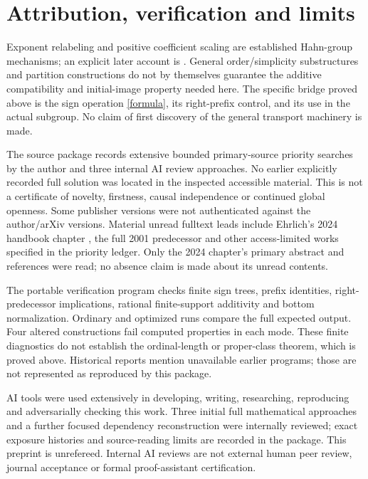 \documentclass[11pt]{article}
\begin{document}
\section{Attribution, verification and limits}
Exponent relabeling and positive coefficient scaling are established
Hahn-group mechanisms; an explicit later account is
\cite[Proposition 3.9 and Construction 3.10]{kks}.
General order/simplicity substructures and partition constructions
\cite{bvh} do not by themselves guarantee the additive compatibility and
initial-image property needed here. The specific bridge proved above is
the sign operation \eqref{formula}, its right-prefix control, and its use
in the actual subgroup. No claim of first discovery of the general
transport machinery is made.

The source package records extensive bounded primary-source priority
searches by the author and three internal AI review approaches.
No earlier explicitly recorded full solution was located in the inspected
accessible material. This is not a certificate of novelty, firstness,
causal independence or continued global openness.
Some publisher versions were not authenticated against the author/arXiv
versions. Material unread fulltext leads include Ehrlich's 2024 handbook
chapter \cite{handbook}, the full 2001 predecessor and other access-limited
works specified in the priority ledger. Only the 2024 chapter's primary
abstract and references were read; no absence claim is made about its
unread contents.

The portable verification program checks finite sign trees, prefix
identities, right-predecessor implications, rational finite-support
additivity and bottom normalization. Ordinary and optimized runs compare
the full expected output. Four altered constructions fail computed
properties in each mode. These finite diagnostics do not establish
the ordinal-length or proper-class theorem, which is proved above.
Historical reports mention unavailable earlier programs; those are not
represented as reproduced by this package.

AI tools were used extensively in developing, writing, researching,
reproducing and adversarially checking this work. Three initial full
mathematical approaches and a further focused dependency reconstruction
were internally reviewed; exact exposure histories and source-reading
limits are recorded in the package. This preprint is unrefereed.
Internal AI reviews are not external human peer review, journal
acceptance or formal proof-assistant certification.
\end{document}
